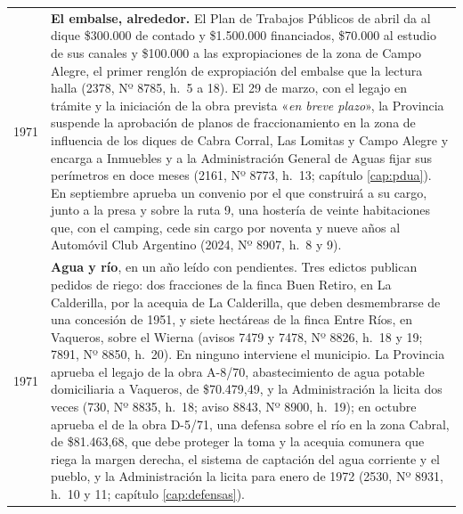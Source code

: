 \begin{longtable}{@{}p{2.7cm}p{10.3cm}@{}}
1971 & \textbf{El embalse, alrededor.} El Plan de Trabajos Públicos de abril da al dique \$300.000 de contado y \$1.500.000 financiados, \$70.000 al estudio de sus canales y \$100.000 a las expropiaciones de la zona de Campo Alegre, el primer renglón de expropiación del embalse que la lectura halla (2378, Nº 8785, h.\ 5 a 18). El 29 de marzo, con el legajo en trámite y la iniciación de la obra prevista «\textit{en breve plazo}», la Provincia suspende la aprobación de planos de fraccionamiento en la zona de influencia de los diques de Cabra Corral, Las Lomitas y Campo Alegre y encarga a Inmuebles y a la Administración General de Aguas fijar sus perímetros en doce meses (2161, Nº 8773, h.\ 13; capítulo \ref{cap:pdua}). En septiembre aprueba un convenio por el que construirá a su cargo, junto a la presa y sobre la ruta 9, una hostería de veinte habitaciones que, con el camping, cede sin cargo por noventa y nueve años al Automóvil Club Argentino (2024, Nº 8907, h.\ 8 y 9). \\
1971 & \textbf{Agua y río}, en un año leído con pendientes. Tres edictos publican pedidos de riego: dos fracciones de la finca Buen Retiro, en La Calderilla, por la acequia de La Calderilla, que deben desmembrarse de una concesión de 1951, y siete hectáreas de la finca Entre Ríos, en Vaqueros, sobre el Wierna (avisos 7479 y 7478, Nº 8826, h.\ 18 y 19; 7891, Nº 8850, h.\ 20). En ninguno interviene el municipio. La Provincia aprueba el legajo de la obra A-8/70, abastecimiento de agua potable domiciliaria a Vaqueros, de \$70.479,49, y la Administración la licita dos veces (730, Nº 8835, h.\ 18; aviso 8843, Nº 8900, h.\ 19); en octubre aprueba el de la obra D-5/71, una defensa sobre el río en la zona Cabral, de \$81.463,68, que debe proteger la toma y la acequia comunera que riega la margen derecha, el sistema de captación del agua corriente y el pueblo, y la Administración la licita para enero de 1972 (2530, Nº 8931, h.\ 10 y 11; capítulo \ref{cap:defensas}). \\

\end{longtable}
